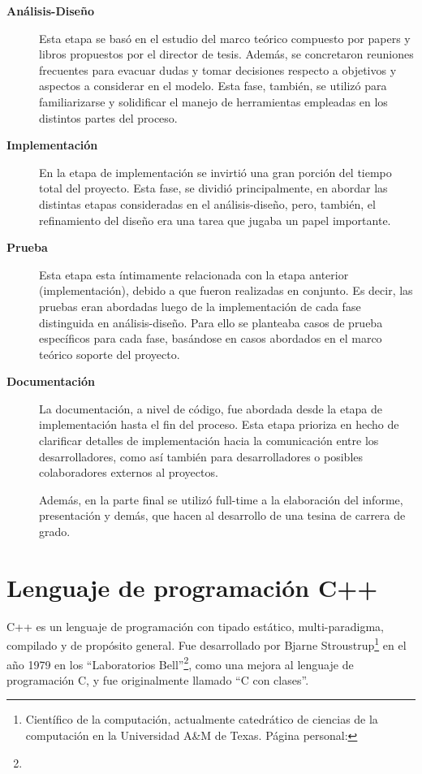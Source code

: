 \begin{description}
\item[\textbf{Análisis-Diseño}] Esta etapa se basó en el estudio del marco teórico compuesto por papers y libros propuestos por el director de tesis. Además, se concretaron reuniones frecuentes para evacuar dudas y tomar decisiones respecto a objetivos y aspectos a considerar en el modelo. Esta fase, también, se utilizó para familiarizarse y solidificar el manejo de herramientas empleadas en los distintos partes del proceso. 

\item[\textbf{Implementación}] En la etapa de implementación se invirtió una gran porción del tiempo total del proyecto. Esta fase, se dividió principalmente, en abordar las distintas etapas consideradas en el análisis-diseño, pero, también, el refinamiento del diseño era una tarea que jugaba un papel importante.

\item[\textbf{Prueba}] Esta etapa esta íntimamente relacionada con la etapa anterior (implementación), debido a que fueron realizadas en conjunto. Es decir, las pruebas eran abordadas luego de la implementación de cada fase distinguida en análisis-diseño. Para ello se planteaba casos de prueba específicos para cada fase, basándose en casos abordados en el marco teórico soporte del proyecto.

\item[\textbf{Documentación}] La documentación, a nivel de código, fue abordada desde la etapa de implementación hasta el fin del proceso. Esta etapa prioriza en hecho de clarificar detalles de implementación hacia la comunicación entre los desarrolladores, como así también para desarrolladores o posibles colaboradores externos al proyectos.

Además, en la parte final se utilizó full-time a la elaboración del informe, presentación y demás, que hacen al desarrollo de una tesina de carrera de grado.
\end{description}

\section{Lenguaje de programación C++}
C++ es un lenguaje de programación con tipado estático, multi-paradigma, compilado y de propósito general. Fue desarrollado por Bjarne Stroustrup\footnote{Científico de la computación, actualmente catedrático de ciencias de la computación en la Universidad A\&M de Texas. Página personal: } en el año 1979 en los ``Laboratorios Bell''\footnote{}, como una mejora al lenguaje de programación C, y fue originalmente llamado ``C con clases''.

